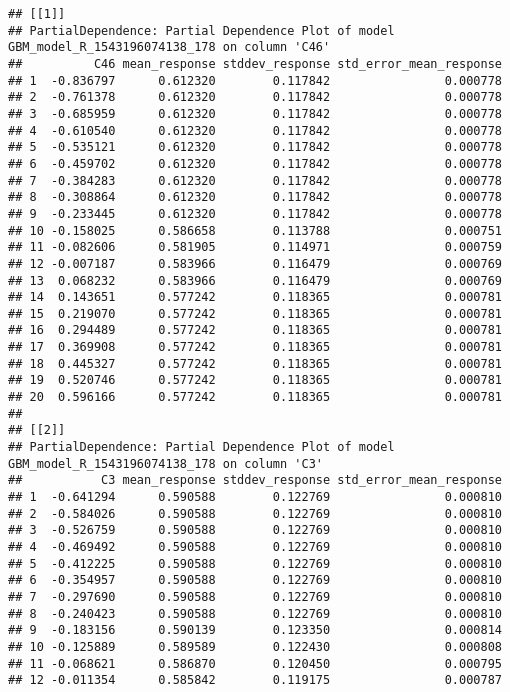 \documentclass[]{article}
\begin{document}
\begin{verbatim}
## [[1]]
## PartialDependence: Partial Dependence Plot of model GBM_model_R_1543196074138_178 on column 'C46'
##          C46 mean_response stddev_response std_error_mean_response
## 1  -0.836797      0.612320        0.117842                0.000778
## 2  -0.761378      0.612320        0.117842                0.000778
## 3  -0.685959      0.612320        0.117842                0.000778
## 4  -0.610540      0.612320        0.117842                0.000778
## 5  -0.535121      0.612320        0.117842                0.000778
## 6  -0.459702      0.612320        0.117842                0.000778
## 7  -0.384283      0.612320        0.117842                0.000778
## 8  -0.308864      0.612320        0.117842                0.000778
## 9  -0.233445      0.612320        0.117842                0.000778
## 10 -0.158025      0.586658        0.113788                0.000751
## 11 -0.082606      0.581905        0.114971                0.000759
## 12 -0.007187      0.583966        0.116479                0.000769
## 13  0.068232      0.583966        0.116479                0.000769
## 14  0.143651      0.577242        0.118365                0.000781
## 15  0.219070      0.577242        0.118365                0.000781
## 16  0.294489      0.577242        0.118365                0.000781
## 17  0.369908      0.577242        0.118365                0.000781
## 18  0.445327      0.577242        0.118365                0.000781
## 19  0.520746      0.577242        0.118365                0.000781
## 20  0.596166      0.577242        0.118365                0.000781
## 
## [[2]]
## PartialDependence: Partial Dependence Plot of model GBM_model_R_1543196074138_178 on column 'C3'
##           C3 mean_response stddev_response std_error_mean_response
## 1  -0.641294      0.590588        0.122769                0.000810
## 2  -0.584026      0.590588        0.122769                0.000810
## 3  -0.526759      0.590588        0.122769                0.000810
## 4  -0.469492      0.590588        0.122769                0.000810
## 5  -0.412225      0.590588        0.122769                0.000810
## 6  -0.354957      0.590588        0.122769                0.000810
## 7  -0.297690      0.590588        0.122769                0.000810
## 8  -0.240423      0.590588        0.122769                0.000810
## 9  -0.183156      0.590139        0.123350                0.000814
## 10 -0.125889      0.589589        0.122430                0.000808
## 11 -0.068621      0.586870        0.120450                0.000795
## 12 -0.011354      0.585842        0.119175                0.000787

\end{verbatim}
\end{document}
